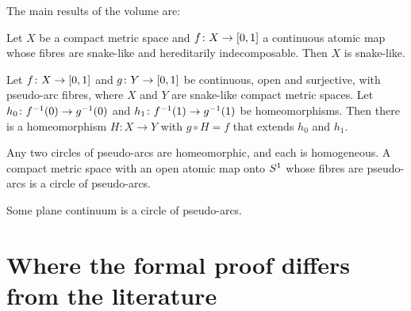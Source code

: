 The main results of the volume are:

\begin{theorem}
Let $X$ be a compact metric space and $f\colon X\to[0,1]$ a continuous atomic map whose fibres are snake-like and hereditarily indecomposable. Then $X$ is
snake-like.
\end{theorem}

\begin{theorem}
Let $f\colon X\to[0,1]$ and $g\colon Y\to[0,1]$ be continuous, open and surjective, with pseudo-arc fibres, where $X$ and $Y$ are snake-like compact metric spaces.
Let $h_0\colon f^{-1}(0)\to g^{-1}(0)$ and $h_1\colon f^{-1}(1)\to g^{-1}(1)$ be homeomorphisms. Then there is a homeomorphism $H\colon X\to Y$ with $g\circ H=f$ that
extends $h_0$ and $h_1$.
\end{theorem}

\begin{theorem}
Any two circles of pseudo-arcs are homeomorphic, and each is homogeneous. A compact metric space with an open atomic map onto $S^1$ whose fibres are
pseudo-arcs is a circle of pseudo-arcs.
\end{theorem}

\begin{theorem}
Some plane continuum is a circle of pseudo-arcs.
\end{theorem}

\section{Where the formal proof differs from the literature}\label{sec:intro-diff}

